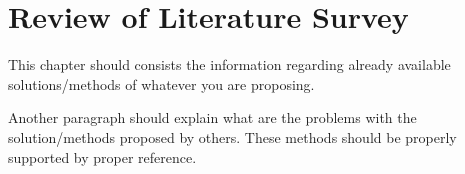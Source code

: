 
\chapter{Review of Literature Survey}
This chapter should consists the information regarding already available solutions/methods of whatever you are proposing. \par
   Another paragraph should explain what are the problems with the solution/methods proposed by others. These methods should be properly supported by proper reference.